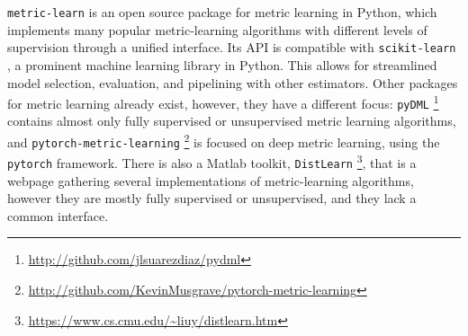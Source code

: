 \documentclass[twoside,11pt]{article}
\newcommand{\aurelien}[1]{\todo[inline,caption={},color=orange!40]{{\it Aurelien:~}#1}}
\begin{document}
\texttt{metric-learn} is an open source package for metric learning in Python, which implements many popular metric-learning algorithms with different levels of supervision through a unified interface.
Its API is compatible with \texttt{scikit-learn} \citep{scikit-learn}, a prominent machine learning library in Python. This allows for streamlined model selection, evaluation, and pipelining with other estimators.
Other packages for metric learning already exist, however, they have a different focus: \texttt{pyDML} \footnote{\url{http://github.com/jlsuarezdiaz/pydml}} contains almost only fully supervised or unsupervised metric learning algorithms, and \texttt{pytorch-metric-learning} \footnote{\url{http://github.com/KevinMusgrave/pytorch-metric-learning}} is focused on deep metric learning, using the \texttt{pytorch} \citep{pytorch} framework. There is also a Matlab toolkit, \texttt{DistLearn} \footnote{\url{https://www.cs.cmu.edu/~liuy/distlearn.htm}}, that is a webpage gathering several implementations of metric-learning algorithms, however they are mostly fully supervised or unsupervised, and they lack a common interface.
\end{document}

